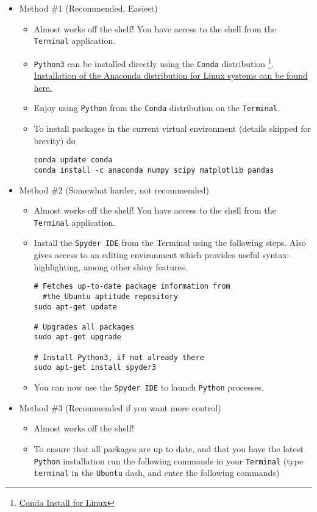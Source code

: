 \documentclass[11pt]{article}
\begin{document}
\begin{itemize}
\item Method \#1 (Recommended, Easiest)
\label{sec:org4824317}
\begin{itemize}
\item Almost works off the shelf! You have access to the shell from the \texttt{Terminal} application.
\item \texttt{Python3} can be installed directly using the \texttt{Conda} distribution \footnote{\href{https://www.anaconda.com/download/\#linux}{Conda Install for Linux}}. \href{https://www.anaconda.com/download/\#linux}{Installation of the Anaconda distribution for Linux systems can be found here.}
\item Enjoy using \texttt{Python} from the \texttt{Conda} distribution on the \texttt{Terminal}.
\item To install packages in the current virtual environment (details skipped for
brevity) do
\begin{verbatim}
conda update conda
conda install -c anaconda numpy scipy matplotlib pandas
\end{verbatim}
\end{itemize}

\item Method \#2 (Somewhat harder, not recommended)
\label{sec:orgf05a321}

\begin{itemize}
\item Almost works off the shelf! You have access to the shell from the \texttt{Terminal} application.
\item Install the \texttt{Spyder IDE} from the Terminal using the following steps. Also
gives access to an editing environment which provides useful
syntax-highlighting, among other shiny features.

\begin{verbatim}
# Fetches up-to-date package information from
  #the Ubuntu aptitude repository
sudo apt-get update

# Upgrades all packages
sudo apt-get upgrade

# Install Python3, if not already there
sudo apt-get install spyder3
\end{verbatim}
\item You can now use the \texttt{Spyder IDE} to launch \texttt{Python} processes.
\end{itemize}

\item Method \#3 (Recommended if you want more control)
\label{sec:org42d5371}
\begin{itemize}
\item Almost works off the shelf!
\item To ensure that all packages are up to date, and that you have the latest
\texttt{Python} installation run the following commands in your \texttt{Terminal} (type
\texttt{terminal} in the \texttt{Ubuntu} dash, and enter the following commands)
\end{itemize}


\end{itemize}
\end{document}
